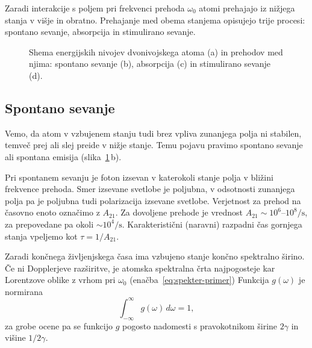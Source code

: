 Zaradi interakcije s poljem pri frekvenci prehoda $\omega_{0}$
atomi prehajajo iz nižjega stanja v višje in obratno. Prehajanje 
med obema stanjema opisujejo trije procesi: 
spontano sevanje, absorpcija in stimulirano sevanje.

\begin{figure}[h]
\centering
\def\svgwidth{145truemm} 

\caption{Shema energijskih nivojev dvonivojskega atoma (a) in prehodov med njima:
spontano sevanje (b), absorpcija (c) in stimulirano sevanje (d).}
\label{sl4.1}
\end{figure}

\subsection*{Spontano sevanje}
Vemo, da atom v vzbujenem stanju tudi brez vpliva zunanjega polja
ni stabilen, temveč prej ali slej preide v nižje stanje. Temu pojavu
pravimo spontano sevanje ali spontana emisija (slika~\ref{sl4.1}\,b).

Pri spontanem sevanju je foton izsevan v katerokoli stanje polja v bližini 
frekvence prehoda. Smer izsevane svetlobe je poljubna, v odsotnosti zunanjega polja
pa je poljubna tudi polarizacija izsevane svetlobe.
Verjetnost za prehod na časovno enoto označimo z $A_{21}$.
Za dovoljene prehode je vrednost $A_{21} \sim 10^6$--$10^8/\si{\second}$, 
za prepovedane pa okoli $\sim 10^4/\si{\second}$. 
Karakteristični (naravni) razpadni čas gornjega stanja vpeljemo kot
$\tau = 1/A_{21}$. 

Zaradi končnega življenjskega časa ima vzbujeno stanje končno spektralno 
širino. Če ni Dop\-pler\-je\-ve razširitve, je atomska spektralna 
črta najpogosteje kar 
Lorentzove oblike z vrhom pri $\omega_0$
(enačba~\ref{eq:spekter-primer})
Funkcija $g(\omega)$ je normirana
\begin{equation}
\int_{-\infty}^\infty g(\omega)\, d\omega=1,
\label{4.20}
\end{equation}
za grobe ocene pa se funkcijo $g$ pogosto nadomesti s pravokotnikom širine
$2\gamma$ in višine $1/2\gamma$.


